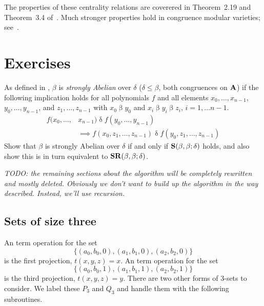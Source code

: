 The properties of these centrality relations are coverered in
Theorem~2.19 and Theorem~3.4 of~\cite{KearnesKiss2013}. Much stronger
properties hold in congruence modular varieties;
see~\cite{FreeseMcKenzie1987}.

\section*{Exercises}

\begin{exercises}

\prob
As defined in \cite{HobbyMcKenzie1988}, $\beta$ is \emph{strongly
Abelian} over $\delta$ ($\delta \leq \beta$, both congruences on $\mathbf{A}$)
if the following implication holds for all polynomials $f$ and all
elements $x_0, \ldots, x_{n-1}$, $y_0, \ldots, y_{n-1}$, and 
$z_1, \ldots, z_{n-1}$ with $x_0 \mathrel\beta y_0$ and
$x_i \mathrel\beta y_i \mathrel\beta z_i$, $i = 1, \ldots n-1$.
\begin{align*}
f(x_0,\ldots,&x_{n-1}) \mathrel\delta f(y_0,\ldots,y_{n-1}) \\
&\implies
f(x_0, z_1,\ldots,z_{n-1}) \mathrel\delta f(y_0, z_1,\ldots,z_{n-1})
\end{align*}
Show that $\beta$ is strongly 
Abelian over $\delta$ if and only if $\mathbf{S}(\beta,\beta;\delta)$ 
holds, and also show this is in turn equivalent to
$\mathbf{SR}(\beta,\beta;\delta)$.
\end{exercises}




\noindent \emph{TODO: the remaining sections about the algorithm will be completely
rewritten and mostly deleted.  Obviously we don't want to build up the 
algorithm in the way described.  Instead, we'll use recursion.}

\subsection{Sets of size three}
An \ld term operation for the set
\begin{equation*}
\{(a_0,b_0, 0), (a_1, b_1, 0), (a_2, b_2, 0)\}
\end{equation*}
is the first projection, $t(x,y,z) = x$.
An \ld term operation for the set
\begin{equation*}
\{(a_0,b_0,1), (a_1, b_1, 1), (a_2, b_2, 1)\}
\end{equation*}
is the third projection, $t(x,y,z) = y$.
There are two other forms of 3-sets to consider.
We label these $P_3$ and $Q_3$ and handle them with 
the following subroutines.

